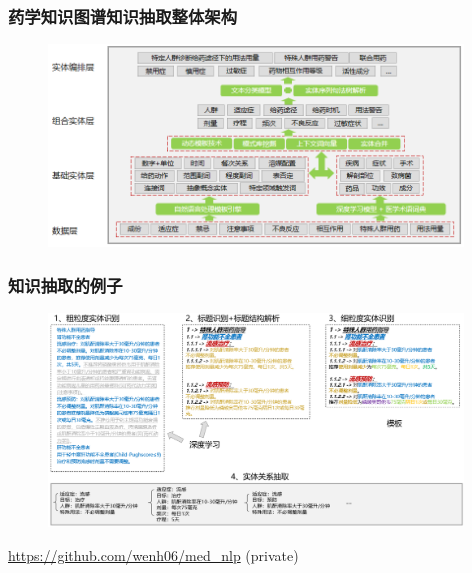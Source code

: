 
\begin{frame}
\frametitle{药学知识图谱知识抽取整体架构}

\begin{figure}
\centering
\includegraphics[width=0.98\textwidth,keepaspectratio]{images/med_knowledge_graph.png}
\end{figure}

\end{frame}


\begin{frame}
\frametitle{知识抽取的例子}

\begin{figure}
\centering
\includegraphics[width=0.98\textwidth,keepaspectratio]{images/di_parsing.png}
\end{figure}

\pause
\vspace{0.5em}

\href{https://github.com/wenh06/med_nlp}{https://github.com/wenh06/med\_nlp} (private)

\end{frame}

